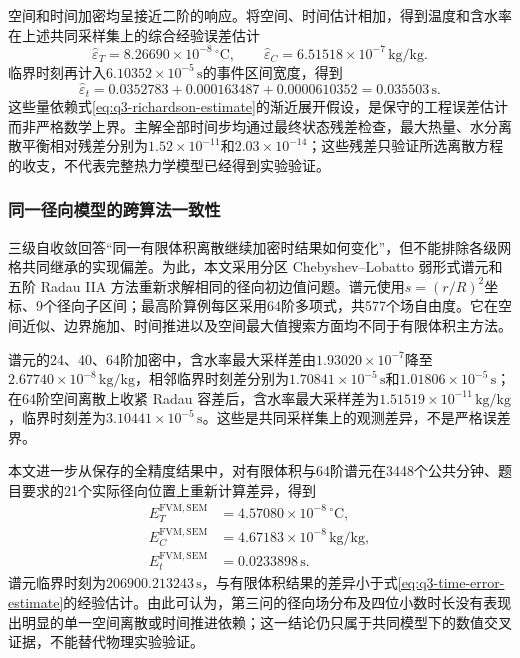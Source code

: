 \documentclass[withoutpreface,bwprint]{cumcmthesis}
\begin{document}
空间和时间加密均呈接近二阶的响应。将空间、时间估计相加，得到温度和含水率在上述共同采样集上的综合经验误差估计
\begin{equation}
\widehat\varepsilon_T=8.26690\times10^{-8}\,{}^\circ\mathrm C,
\qquad
\widehat\varepsilon_C=6.51518\times10^{-7}\,\mathrm{kg/kg}.
\label{eq:q3-field-error-estimates}
\end{equation}
临界时刻再计入$6.10352\times10^{-5}\,\mathrm s$的事件区间宽度，得到
\begin{equation}
\widehat\varepsilon_t
=0.0352783+0.000163487+0.0000610352
=0.035503\,\mathrm s.
\label{eq:q3-time-error-estimate}
\end{equation}
这些量依赖式\eqref{eq:q3-richardson-estimate}的渐近展开假设，是保守的工程误差估计而非严格数学上界。主解全部时间步均通过最终状态残差检查，最大热量、水分离散平衡相对残差分别为$1.52\times10^{-11}$和$2.03\times10^{-14}$；这些残差只验证所选离散方程的收支，不代表完整热力学模型已经得到实验验证。

\subsubsection{同一径向模型的跨算法一致性}

三级自收敛回答“同一有限体积离散继续加密时结果如何变化”，但不能排除各级网格共同继承的实现偏差。为此，本文采用分区 Chebyshev--Lobatto 弱形式谱元\cite{trefethen2000}和五阶 Radau IIA 方法\cite{hairer1996}重新求解相同的径向初边值问题。谱元使用$s=(r/R)^2$坐标、9个径向子区间；最高阶算例每区采用64阶多项式，共577个场自由度。它在空间近似、边界施加、时间推进以及空间最大值搜索方面均不同于有限体积主方法。

谱元的24、40、64阶加密中，含水率最大采样差由$1.93020\times10^{-7}$降至$2.67740\times10^{-8}\,\mathrm{kg/kg}$，相邻临界时刻差分别为$1.70841\times10^{-5}\,\mathrm s$和$1.01806\times10^{-5}\,\mathrm s$；在64阶空间离散上收紧 Radau 容差后，含水率最大采样差为$1.51519\times10^{-11}\,\mathrm{kg/kg}$，临界时刻差为$3.10441\times10^{-5}\,\mathrm s$。这些是共同采样集上的观测差异，不是严格误差界。

本文进一步从保存的全精度结果中，对有限体积与64阶谱元在3448个公共分钟、题目要求的21个实际径向位置上重新计算差异，得到
\begin{equation}
\begin{aligned}
E_T^{\mathrm{FVM,SEM}}&=4.57080\times10^{-8}\,{}^\circ\mathrm C,\\
E_C^{\mathrm{FVM,SEM}}&=4.67183\times10^{-8}\,\mathrm{kg/kg},\\
E_t^{\mathrm{FVM,SEM}}&=0.0233898\,\mathrm s.
\end{aligned}
\label{eq:q3-cross-algorithm-differences}
\end{equation}
谱元临界时刻为$206900.213243\,\mathrm s$，与有限体积结果的差异小于式\eqref{eq:q3-time-error-estimate}的经验估计。由此可认为，第三问的径向场分布及四位小数时长没有表现出明显的单一空间离散或时间推进依赖；这一结论仍只属于共同模型下的数值交叉证据，不能替代物理实验验证。
\end{document}
